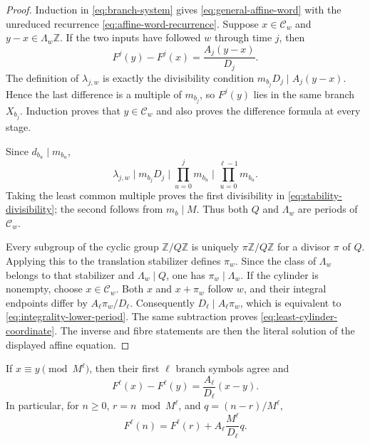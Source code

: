 \begin{proof}
Induction in \eqref{eq:branch-system} gives
\eqref{eq:general-affine-word} with the unreduced recurrence
\eqref{eq:affine-word-recurrence}.  Suppose $x\in\mathcal C_w$ and
$y-x\in\Lambda_w\mathbb Z$.  If the two inputs have followed $w$ through
time $j$, then
\[
 F^j(y)-F^j(x)=\frac{A_j(y-x)}{D_j}.
\]
The definition of $\lambda_{j,w}$ is exactly the divisibility condition
$m_{b_j}D_j\mid A_j(y-x)$.  Hence the last difference is a multiple of
$m_{b_j}$, so $F^j(y)$ lies in the same branch $X_{b_j}$.  Induction proves
that $y\in\mathcal C_w$ and also proves the difference formula at every
stage.

Since $d_{b_u}\mid m_{b_u}$,
\[
 \lambda_{j,w}\mid m_{b_j}D_j
 \mid\prod_{u=0}^{j}m_{b_u}
 \mid\prod_{u=0}^{\ell-1}m_{b_u}.
\]
Taking the least common multiple proves the first divisibility in
\eqref{eq:stability-divisibility}; the second follows from $m_b\mid M$.
Thus both $Q$ and $\Lambda_w$ are periods of $\mathcal C_w$.

Every subgroup of the cyclic group $\mathbb Z/Q\mathbb Z$ is uniquely
$\pi\mathbb Z/Q\mathbb Z$ for a divisor $\pi$ of $Q$.  Applying this to the
translation stabilizer defines $\pi_w$.  Since the class of $\Lambda_w$
belongs to that stabilizer and $\Lambda_w\mid Q$, one has
$\pi_w\mid\Lambda_w$.  If the cylinder is nonempty, choose
$x\in\mathcal C_w$.  Both $x$ and $x+\pi_w$ follow $w$, and their integral
endpoints differ by $A_\ell\pi_w/D_\ell$.  Consequently
$D_\ell\mid A_\ell\pi_w$, which is equivalent to
\eqref{eq:integrality-lower-period}.  The same subtraction proves
\eqref{eq:least-cylinder-coordinate}.  The inverse and fibre statements are
then the literal solution of the displayed affine equation.
\end{proof}

\begin{corollary}
\label{cor:retained-cylinder-coordinate}
If $x\equiv y\pmod{M^\ell}$, then their first $\ell$ branch symbols agree and
\begin{equation}
 F^\ell(x)-F^\ell(y)=\frac{A_\ell}{D_\ell}(x-y).
 \label{eq:general-cylinder-difference}
\end{equation}
In particular, for $n\ge0$, $r=n\bmod M^\ell$, and
$q=(n-r)/M^\ell$,
\begin{equation}
 F^\ell(n)=F^\ell(r)+A_\ell\frac{M^\ell}{D_\ell}q.
 \label{eq:general-cylinder-coordinate}
\end{equation}
\end{corollary}

